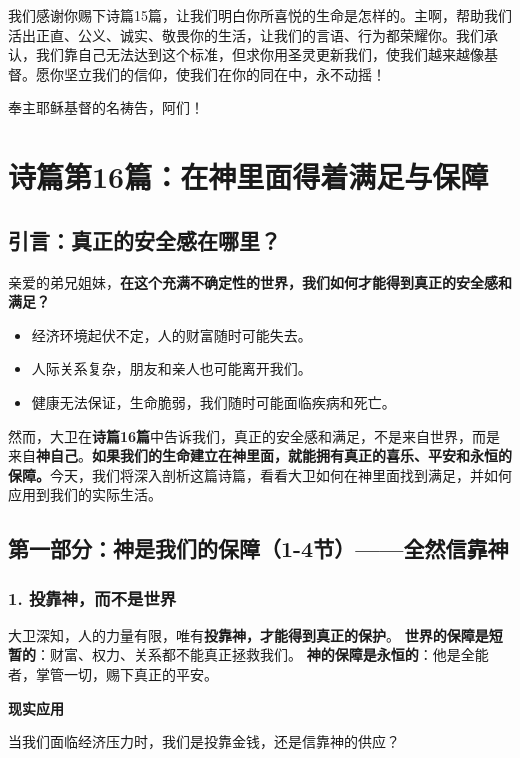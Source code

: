 \documentclass[a4paper, 12pt]{article}
\begin{document}
我们感谢你赐下诗篇15篇，让我们明白你所喜悦的生命是怎样的。主啊，帮助我们活出正直、公义、诚实、敬畏你的生活，让我们的言语、行为都荣耀你。我们承认，我们靠自己无法达到这个标准，但求你用圣灵更新我们，使我们越来越像基督。愿你坚立我们的信仰，使我们在你的同在中，永不动摇！

奉主耶稣基督的名祷告，阿们！
\newpage
\section{诗篇第16篇：在神里面得着满足与保障}

\subsection*{引言：真正的安全感在哪里？ }
亲爱的弟兄姐妹，\textbf{在这个充满不确定性的世界，我们如何才能得到真正的安全感和满足？} 
\begin{itemize}
    \item 经济环境起伏不定，人的财富随时可能失去。
    \item 人际关系复杂，朋友和亲人也可能离开我们。  
    \item 健康无法保证，生命脆弱，我们随时可能面临疾病和死亡。
\end{itemize}
然而，大卫在\textbf{诗篇16篇}中告诉我们，真正的安全感和满足，不是来自世界，而是来自\textbf{神自己}。\textbf{如果我们的生命建立在神里面，就能拥有真正的喜乐、平安和永恒的保障。}今天，我们将深入剖析这篇诗篇，看看大卫如何在神里面找到满足，并如何应用到我们的实际生活。  

\subsection*{第一部分：神是我们的保障（1-4节）——全然信靠神}

\subsubsection*{1. 投靠神，而不是世界 }

\hspace{0.6cm}大卫深知，人的力量有限，唯有\textbf{投靠神，才能得到真正的保护}。  
\textbf{世界的保障是短暂的}：财富、权力、关系都不能真正拯救我们。  
\textbf{神的保障是永恒的}：他是全能者，掌管一切，赐下真正的平安。  
\vspace{0.2cm}

\textbf{现实应用} 

\hspace{0.6cm}当我们面临经济压力时，我们是投靠金钱，还是信靠神的供应？
\end{document}
